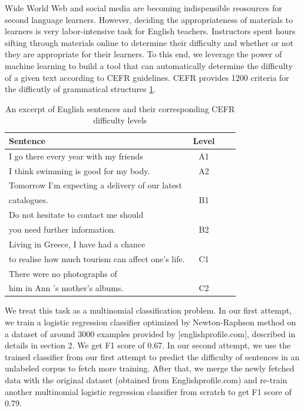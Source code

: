 Wide World Web and social media are becoming indispensible reosources for second language learners. However, deciding the appropriateness of materials to learners is very labor-intensive task for English teachers. Instructors spent hours sifting through materials online to determine their difficulty and whether or not they are appropriate for their learners. To this end, we leverage the power of machine learning to build a tool that can automatically determine the difficulty of a given text according to CEFR guidelines. 
CEFR provides 1200 criteria \citep{noauthor_english_nodate} for the difficutly of grammatical structures \ref{tab:cefr}.
\begin{table}
\caption{An excerpt of English sentences and their corresponding CEFR difficulty levels}
\centering
\begin{tabular}{l|c|c|c}
Sentence   & Level \\
\hline
I go there every year with my friends & A1 & \\
I think swimming is good for my body. & A2 & \\
Tomorrow I'm expecting a delivery of our latest\\ catalogues. & B1 & \\
Do not hesitate to contact me should \\you need further information. & B2 & \\
Living in Greece, I have had a chance \\to realise how much tourism can affect one's life. & C1 & \\
There were no photographs of \\him in Ann 's mother's albums. & C2 & \\
\end{tabular}
\label{tab:cefr}
\end{table}

We treat this task as a multinomial classification problem. In our first attempt, we train a logistic regression classifier optimized by Newton-Raphson method on a dataset of around 3000 examples provided by [englishprofile.com], described in details in section 2. We get F1 score of 0.67. In our second attempt, we use the trained classifier from our first attempt to predict the difficulty of sentences in an unlabeled corpus to fetch more training. After that, we merge the newly fetched data with the original dataset (obtained from Englishprofile.com) and re-train another multinomial logistic regression classifier from scratch to get F1 score of 0.79. 

